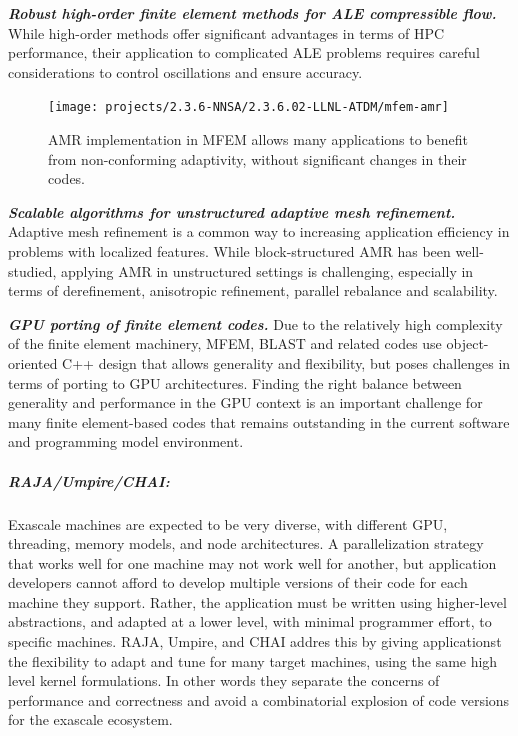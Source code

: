 \noindent
{\bf \em Robust high-order finite element methods for ALE compressible flow.}
While high-order methods offer significant advantages in terms of HPC performance,
their application to complicated ALE problems requires careful considerations to
control oscillations and ensure accuracy.

\begin{figure}[htb]
\centering
\texttt{[image: projects/2.3.6-NNSA/2.3.6.02-LLNL-ATDM/mfem-amr]}
\caption{\label{fig:mfem-amr}AMR implementation in MFEM allows many applications to benefit from non-conforming adaptivity, without significant changes in their codes.}
\end{figure}

\noindent
{\bf \em Scalable algorithms for unstructured adaptive mesh refinement.}
Adaptive mesh refinement is a common way to increasing application efficiency
in problems with localized features. While block-structured AMR has been
well-studied, applying AMR in unstructured settings is challenging, especially
in terms of derefinement, anisotropic refinement, parallel rebalance and
scalability.

\noindent
{\bf \em GPU porting of finite element codes.}
Due to the relatively high complexity of the finite element machinery, MFEM,
BLAST and related codes use object-oriented C++ design that allows generality
and flexibility, but poses challenges in terms of porting to GPU architectures.
Finding the right balance between generality and performance in the GPU context
is an important challenge for many finite element-based codes that remains
outstanding in the current software and programming model environment.

\subparagraph{RAJA/Umpire/CHAI:}
Exascale machines are expected to be very diverse, with different GPU,
threading, memory models, and node architectures.  A parallelization
strategy that works well for one machine may not work well for another,
but application developers cannot afford to develop multiple versions of
their code for each machine they support.  Rather, the application must
be written using higher-level abstractions, and adapted at a lower level,
with minimal programmer effort, to specific machines.  RAJA, Umpire, and
CHAI addres this by giving applicationst the flexibility to adapt and
tune for many target machines, using the same high level kernel
formulations.  In other words they separate the concerns of performance
and correctness and avoid a combinatorial explosion of code versions for
the exascale ecosystem.


